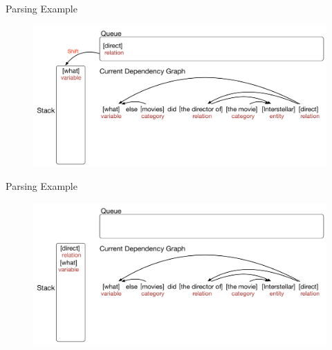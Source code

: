 \documentclass{beamer}
\begin{document}
\begin{frame}{Parsing Example}
	\begin{figure}
		\centering\includegraphics[width=1.0\textwidth]{introduction/parsing_examples/26.pdf}
	\end{figure}	
\end{frame}

\begin{frame}{Parsing Example}
	\begin{figure}
		\centering\includegraphics[width=1.0\textwidth]{introduction/parsing_examples/27.pdf}
	\end{figure}	
\end{frame}
\end{document}
